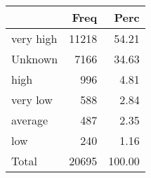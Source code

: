 
\begin{tabular}[t]{lrr}
\toprule
  & Freq & Perc\\
\midrule
very high & 11218 & 54.21\\
Unknown & 7166 & 34.63\\
high & 996 & 4.81\\
very low & 588 & 2.84\\
average & 487 & 2.35\\
\addlinespace
low & 240 & 1.16\\
Total & 20695 & 100.00\\
\bottomrule
\end{tabular}